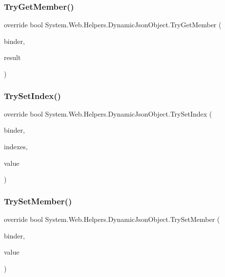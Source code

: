 \subsubsection{\texorpdfstring{Try\+Get\+Member()}{TryGetMember()}}
{\footnotesize\ttfamily override bool System.\+Web.\+Helpers.\+Dynamic\+Json\+Object.\+Try\+Get\+Member (\begin{DoxyParamCaption}\item[{Get\+Member\+Binder}]{binder,  }\item[{out object}]{result }\end{DoxyParamCaption})}

\mbox{\label{classSystem_1_1Web_1_1Helpers_1_1DynamicJsonObject_a6d9229dd7bc1149540e8c71b3755ed87}} 
\subsubsection{\texorpdfstring{Try\+Set\+Index()}{TrySetIndex()}}
{\footnotesize\ttfamily override bool System.\+Web.\+Helpers.\+Dynamic\+Json\+Object.\+Try\+Set\+Index (\begin{DoxyParamCaption}\item[{Set\+Index\+Binder}]{binder,  }\item[{object \mbox{[}$\,$\mbox{]}}]{indexes,  }\item[{object}]{value }\end{DoxyParamCaption})}

\mbox{\label{classSystem_1_1Web_1_1Helpers_1_1DynamicJsonObject_a2751e8fe84adaf0dd4c3430224b10203}} 
\subsubsection{\texorpdfstring{Try\+Set\+Member()}{TrySetMember()}}
{\footnotesize\ttfamily override bool System.\+Web.\+Helpers.\+Dynamic\+Json\+Object.\+Try\+Set\+Member (\begin{DoxyParamCaption}\item[{Set\+Member\+Binder}]{binder,  }\item[{object}]{value }\end{DoxyParamCaption})}

